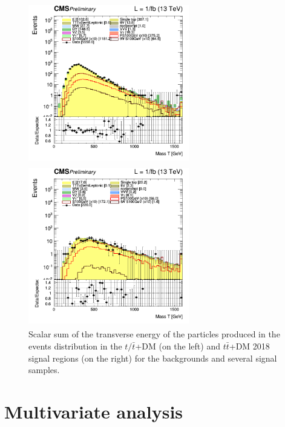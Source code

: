 \documentclass[a4paper, 10pt, openright]{report}
\begin{document}
\begin{itemize}
\begin{figure}[htbp]
\centering
\begin{minipage}[b]{.48\textwidth}
\includegraphics[width=7cm, height=7cm]{figs/log_cratio_topCR_ll_2j_signal1_massT.png}
\end{minipage}\hfill
\begin{minipage}[b]{.48\textwidth}
\includegraphics[width=7cm, height=7cm]{figs/log_cratio_topCR_ll_2j_signal0_massT.png}
\end{minipage} \hfill
\caption{Scalar sum of the transverse energy of the particles produced in the events distribution in the $t/ \bar t$+DM (on the left) and $t \bar t$+DM 2018 signal regions (on the right) for the backgrounds and several signal samples.}
\label{fig:SRdisc6}
\end{figure}
\end{itemize}

\section{Multivariate analysis} \label{section:NN}

\end{document}
